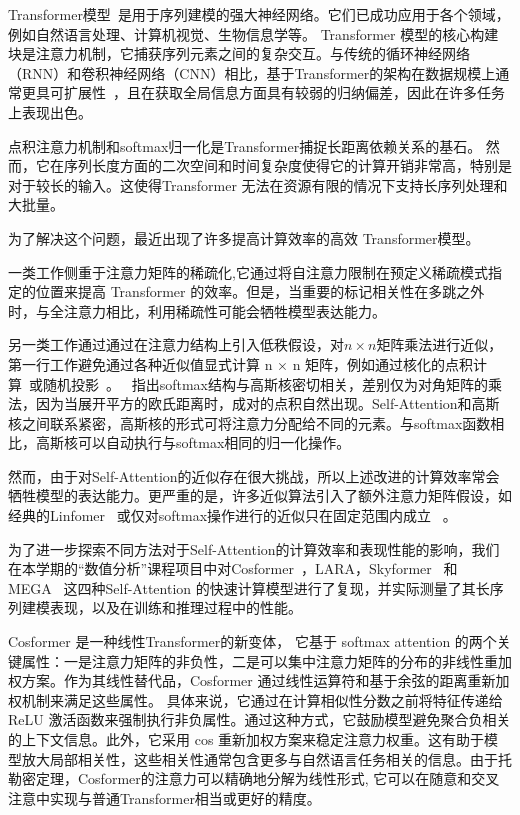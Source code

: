 Transformer模型~\cite{vaswani2017attention}是用于序列建模的强大神经网络。它们已成功应用于各个领域，例如自然语言处理、计算机视觉、生物信息学等。 Transformer 模型的核心构建块是注意力机制，它捕获序列元素之间的复杂交互。与传统的循环神经网络（RNN）和卷积神经网络（CNN）相比，基于Transformer的架构在数据规模上通常更具可扩展性~\cite{brown2020language}，且在获取全局信息方面具有较弱的归纳偏差，因此在许多任务上表现出色。

点积注意力机制和softmax归一化是Transformer捕捉长距离依赖关系的基石。
然而，它在序列长度方面的二次空间和时间复杂度使得它的计算开销非常高，特别是对于较长的输入。这使得Transformer 无法在资源有限的情况下支持长序列处理和大批量。

\hspace{0.2cm}

为了解决这个问题，最近出现了许多提高计算效率的高效 Transformer模型。

一类工作侧重于注意力矩阵的稀疏化,它通过将自注意力限制在预定义稀疏模式指定的位置来提高 Transformer 的效率。但是，当重要的标记相关性在多跳之外时，与全注意力相比，利用稀疏性可能会牺牲模型表达能力。

另一类工作通过通过在注意力结构上引入低秩假设，对$n\times n$矩阵乘法进行近似，第一行工作避免通过各种近似值显式计算 n × n 矩阵，例如通过核化的点积计算~\cite{wang2020linformer}或随机投影~\cite{peng2021random}。~\cite{choromanski2020rethinking} 指出softmax结构与高斯核密切相关，差别仅为对角矩阵的乘法，因为当展开平方的欧氏距离时，成对的点积自然出现。Self-Attention和高斯核之间联系紧密，高斯核的形式可将注意力分配给不同的元素。与softmax函数相比，高斯核可以自动执行与softmax相同的归一化操作。

\hspace{0.2cm}

然而，由于对Self-Attention的近似存在很大挑战，所以上述改进的计算效率常会牺牲模型的表达能力。更严重的是，许多近似算法引入了额外注意力矩阵假设，如经典的Linfomer~\cite{wang2020linformer} 或仅对softmax操作进行的近似只在固定范围内成立~\cite{choromanski2020rethinking} 。

为了进一步探索不同方法对于Self-Attention的计算效率和表现性能的影响，我们在本学期的“数值分析”课程项目中对Cosformer~\cite{zhen2022cosformer}，LARA\cite{pmlr-v162-zheng22b}，Skyformer~\cite{chen2021skyformer} 和 MEGA~\cite{ma2023mega} 这四种Self-Attention 的快速计算模型进行了复现，并实际测量了其长序列建模表现，以及在训练和推理过程中的性能。

\hspace{0.2cm}

Cosformer 是一种线性Transformer的新变体， 它基于 softmax attention 的两个关键属性：一是注意力矩阵的非负性，二是可以集中注意力矩阵的分布的非线性重加权方案。作为其线性替代品，Cosformer 通过线性运算符和基于余弦的距离重新加权机制来满足这些属性。
具体来说，它通过在计算相似性分数之前将特征传递给 ReLU 激活函数来强制执行非负属性。通过这种方式，它鼓励模型避免聚合负相关的上下文信息。此外，它采用 cos 重新加权方案来稳定注意力权重。这有助于模型放大局部相关性，这些相关性通常包含更多与自然语言任务相关的信息。由于托勒密定理，Cosformer的注意力可以精确地分解为线性形式,
它可以在随意和交叉注意中实现与普通Transformer相当或更好的精度。

